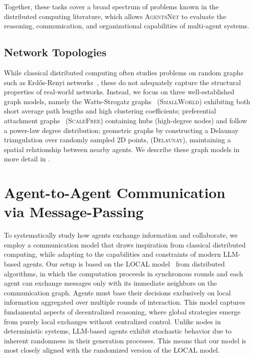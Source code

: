 \documentclass{article}
\newcommand{\benchmark}{\textsc{AgentsNet}}
\begin{document}
Together, these tasks cover a broad spectrum of problems known in the distributed 
computing literature, which allows \benchmark{} to evaluate the reasoning, communication, and organizational capabilities of multi-agent systems.


\subsection{Network Topologies}
While classical distributed computing often studies problems on random graphs such as Erd\H{o}s-Renyi networks~\citep{erdos1960evolution}, these do not adequately capture the structural properties of real-world networks. Instead, we focus on three well-established graph models, namely the Watts-Strogatz graphs~\citep{watts1998collective} (\textsc{SmallWorld}) exhibiting both short average path lengths and high clustering coefficients; preferential attachment graphs~\citep{barabasi1999emergence} (\textsc{ScaleFree}) containing hubs (high-degree nodes) and follow a power-law degree distribution; geometric graphs by constructing a Delaunay triangulation over randomly sampled 2D points, (\textsc{Delaunay}), maintaining a spatial relationship between nearby agents. We describe these graph models in more detail in .



\section{Agent-to-Agent Communication via Message-Passing}\label{sec:mp_protocol}
To systematically study how agents exchange information and collaborate, we employ a communication model that draws inspiration from classical distributed computing, while adapting to the capabilities and constraints of modern LLM-based agents.
Our setup is based on the LOCAL model~\citep{linial1992local} from distributed algorithms, in which the computation proceeds in synchronous rounds and each agent can exchange messages only with its immediate neighbors on the communication graph. Agents must base their decisions exclusively on local information aggregated over multiple rounds of interaction. This model captures fundamental aspects of decentralized reasoning, where global strategies emerge from purely local exchanges without centralized control. 
Unlike nodes in deterministic systems, LLM-based agents exhibit stochastic behavior due to inherent randomness in their generation processes. This means that our model is most closely aligned with the randomized version of the LOCAL model.
\end{document}
